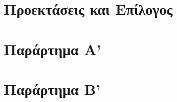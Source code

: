 \documentclass[hidelinks,a4paper,11pt,twoside]{book}
\begin{document}
\chapter{Προεκτάσεις και Επίλογος}\label{ch:epilogue}

\clearemptydoublepage

\backmatter
 

% 
\clearemptydoublepage

\chapter{Παράρτημα Α'}\label{ch:appendixA}

\clearemptydoublepage

\chapter{Παράρτημα Β'}\label{ch:appendixB}

\clearemptydoublepage


\end{document}
